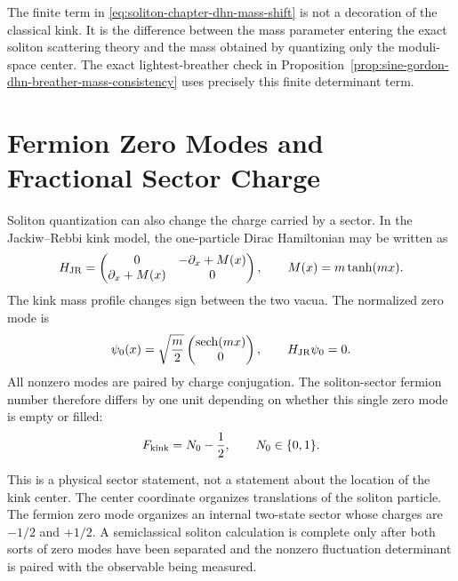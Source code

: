 The finite term in \eqref{eq:soliton-chapter-dhn-mass-shift} is not a
decoration of the classical kink.  It is the difference between the mass
parameter entering the exact soliton scattering theory and the mass obtained
by quantizing only the moduli-space center.  The exact lightest-breather
check in Proposition~\ref{prop:sine-gordon-dhn-breather-mass-consistency}
uses precisely this finite determinant term.

\section{Fermion Zero Modes and Fractional Sector Charge}
\label{sec:soliton-fermion-zero-modes-fractional-charge}

Soliton quantization can also change the charge carried by a sector.  In the
Jackiw--Rebbi kink model, the one-particle Dirac Hamiltonian may be written
as
\begin{equation}
  H_{\rm JR}
  =
  \begin{pmatrix}
    0 & -\partial_x+M(x)\\
    \partial_x+M(x) & 0
  \end{pmatrix},
  \qquad
  M(x)=m\tanh(mx).
  \label{eq:soliton-chapter-jackiw-rebbi-kink-hamiltonian}
\end{equation}
The kink mass profile changes sign between the two vacua.  The normalized
zero mode is
\begin{equation}
  \psi_0(x)
  =
  \sqrt{\frac m2}
  \begin{pmatrix}
    \operatorname{sech}(mx)\\
    0
  \end{pmatrix},
  \qquad
  H_{\rm JR}\psi_0=0 .
  \label{eq:soliton-chapter-jackiw-rebbi-kink-zero-mode}
\end{equation}
All nonzero modes are paired by charge conjugation.  The soliton-sector
fermion number therefore differs by one unit depending on whether this single
zero mode is empty or filled:
\begin{equation}
  F_{\rm kink}
  =
  N_0-\frac12,
  \qquad
  N_0\in\{0,1\}.
  \label{eq:soliton-chapter-jackiw-rebbi-kink-half-charge}
\end{equation}

This is a physical sector statement, not a statement about the location of
the kink center.  The center coordinate organizes translations of the soliton
particle.  The fermion zero mode organizes an internal two-state sector whose
charges are \(-1/2\) and \(+1/2\).  A semiclassical soliton calculation is
complete only after both sorts of zero modes have been separated and the
nonzero fluctuation determinant is paired with the observable being measured.
